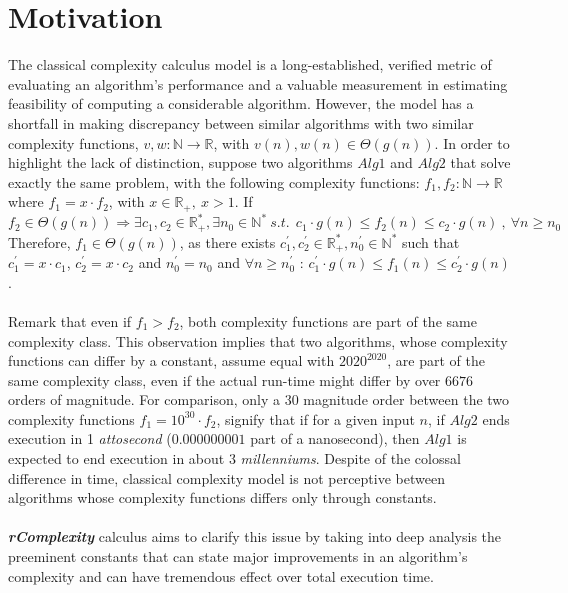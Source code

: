 \section{Motivation}
The classical complexity calculus model is a long-established, verified metric of evaluating an algorithm's performance and a valuable measurement in estimating feasibility of computing a considerable algorithm. However, the model has a shortfall in making discrepancy between similar algorithms with two similar complexity functions, $v,w:\mathbb{N}\longrightarrow\mathbb{R}$, with $v(n),w(n) \in \Theta(g(n))$. In order to highlight the lack of distinction, suppose two algorithms $Alg1$ and $Alg2$ that solve exactly the same problem, with the following complexity functions:
$f_{1},f_{2}:\mathbb{N}\longrightarrow\mathbb{R}$ where $f_{1} = x \cdot f_{2}$, with $x \in \mathbb{R}_{+}, \ x > 1$.
If \[ f_{2} \in \Theta(g(n)) \Rightarrow \exists c_{1}, c_{2} \in \mathbb{R}^{*}_{+}, \exists n_{0} \in \mathbb{N}^{*}\ s.t.\ \ c_{1} \cdot g(n) \leq f_{2}(n) \leq c_{2} \cdot g(n)\ ,\  \forall n \geq n_{0} \]
Therefore, $f_{1} \in \Theta(g(n))$, as there exists $ c_{1}^{'}, c_{2}^{'} \in \mathbb{R}^{*}_{+},  n_{0}^{'} \in \mathbb{N}^{*}$ such that $ c_{1}^{'} =  x \cdot c_{1} $, $ c_{2}^{'} =  x \cdot c_{2} $ and $n_{0}^{'} = n_{0}$ and  $\forall n \geq n_{0}^{'} $ :  $c_{1}^{'} \cdot g(n) \leq f_{1}(n) \leq c_{2}^{'} \cdot g(n)$.
\\ \\ 
Remark that even if $f_{1} > f_{2}$, both complexity functions are part of the same complexity class. This observation implies that two algorithms, whose complexity functions can differ by a constant, assume equal with $2020^{2020}$, are part of the same complexity class, even if the actual run-time might differ by over $6676$ orders of magnitude. For comparison, only a $30$ magnitude order between the two complexity functions $f_{1} = 10^{30} \cdot f_{2}$, signify
that if for a given input $n$, if $Alg2$ ends execution in 1 \textit{attosecond} ($0.000000001$ part of a nanosecond), then $Alg1$ is expected to end execution in about 3 \textit{millenniums}. Despite of the colossal difference in time, classical complexity model is not perceptive between algorithms whose complexity functions differs only through constants. \\ \\ 
\textbf{\textit{rComplexity}} calculus aims to clarify this issue by taking into deep analysis the preeminent constants that can state major improvements in an algorithm's complexity and can have tremendous effect over total execution time. 


